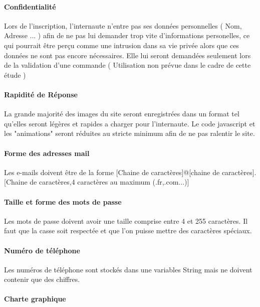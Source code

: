 \paragraph{Confidentialité}

Lors de l'inscription, l'internaute n'entre pas ses données personnelles ( Nom, Adresse ... ) afin de ne pas lui demander trop vite
d'informations personelles, ce qui pourrait être perçu comme une intrusion dans sa vie privée alors que ces données ne sont pas encore
nécessaires. Elle lui seront demandées seulement lors de la validation d'une commande ( Utilisation non prévue dans le cadre de cette étude )

\paragraph{Rapidité de Réponse}
	
La grande majorité des images du site seront enregistrées dans un format tel qu'elles seront légères et rapides a charger pour l'internaute.
Le code javascript et les "animations" seront réduites au stricte minimum afin de ne pas ralentir le site.

\paragraph{Forme des adresses mail}

Les e-mails doivent être de la forme [Chaine de caractères]@[chaine de caractères].[Chaine de caractères,4 caractères au maximum (.fr,.com...)]

\paragraph{Taille et forme des mots de passe}

Les mots de passe doivent avoir une taille comprise entre 4 et 255 caractères. Il faut que la casse soit respectée et que l'on puisse mettre des caractères spéciaux.

\paragraph{Numéro de téléphone}

Les numéros de téléphone sont stockés dans une variables String mais ne doivent contenir que des chiffres.

\paragraph{Charte graphique}

